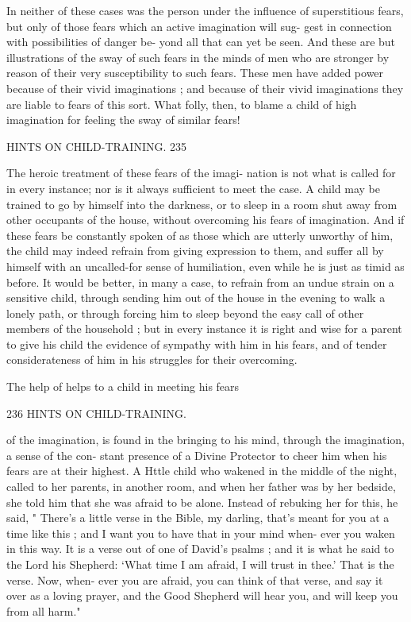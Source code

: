 \documentclass[
]{book}
\begin{document}
In neither of these cases was the person under the influence of superstitious fears, but only of those fears which an active imagination will sug- gest in connection with possibilities of danger be- yond all that can yet be seen. And these are but illustrations of the sway of such fears in the minds of men who are stronger by reason of their very susceptibility to such fears. These men have added power because of their vivid imaginations ; and because of their vivid imaginations they are liable to fears of this sort. What folly, then, to blame a child of high imagination for feeling the sway of similar fears!

HINTS ON CHILD-TRAINING. 235

The heroic treatment of these fears of the imagi- nation is not what is called for in every instance; nor is it always sufficient to meet the case. A child may be trained to go by himself into the darkness, or to sleep in a room shut away from other occupants of the house, without overcoming his fears of imagination. And if these fears be constantly spoken of as those which are utterly unworthy of him, the child may indeed refrain from giving expression to them, and suffer all by himself with an uncalled-for sense of humiliation, even while he is just as timid as before. It would be better, in many a case, to refrain from an undue strain on a sensitive child, through sending him out of the house in the evening to walk a lonely path, or through forcing him to sleep beyond the easy call of other members of the household ; but in every instance it is right and wise for a parent to give his child the evidence of sympathy with him in his fears, and of tender considerateness of him in his struggles for their overcoming.

The help of helps to a child in meeting his fears

236 HINTS ON CHILD-TRAINING.

of the imagination, is found in the bringing to his mind, through the imagination, a sense of the con- stant presence of a Divine Protector to cheer him when his fears are at their highest. A Httle child who wakened in the middle of the night, called to her parents, in another room, and when her father was by her bedside, she told him that she was afraid to be alone. Instead of rebuking her for this, he said, " There's a little verse in the Bible, my darling, that's meant for you at a time like this ; and I want you to have that in your mind when- ever you waken in this way. It is a verse out of one of David's psalms ; and it is what he said to the Lord his Shepherd: `What time I am afraid, I will trust in thee.' That is the verse. Now, when- ever you are afraid, you can think of that verse, and say it over as a loving prayer, and the Good Shepherd will hear you, and will keep you from all harm."
\end{document}

